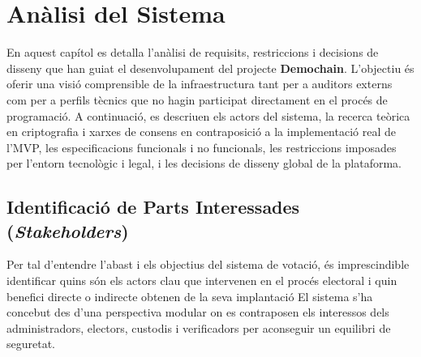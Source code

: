 

\chapter{Anàlisi del Sistema}
\label{ch:analisi-del-sistema}

En aquest capítol es detalla l'anàlisi de requisits, restriccions i decisions de disseny que han guiat el
desenvolupament del projecte \textbf{Demochain}.
L'objectiu és oferir una visió comprensible de la infraestructura tant per a auditors externs com per a perfils tècnics
que no hagin participat directament en el procés de programació.
A continuació, es descriuen els actors del sistema, la recerca teòrica en criptografia i xarxes de consens en
contraposició a la implementació real de l'\ac{MVP}\@, les especificacions funcionals i no funcionals, les restriccions
imposades per l'entorn tecnològic i legal, i les decisions de disseny global de la plataforma.


\section{Identificació de Parts Interessades (\textit{Stakeholders})}\label{sec:stakeholders}

Per tal d'entendre l'abast i els objectius del sistema de votació, és imprescindible identificar quins són els actors
clau que intervenen en el procés electoral i quin benefici directe o indirecte obtenen de la seva implantació El sistema
s'ha concebut des d'una perspectiva modular on es contraposen els interessos dels administradors, electors, custodis i
verificadors per aconseguir un equilibri de seguretat.

